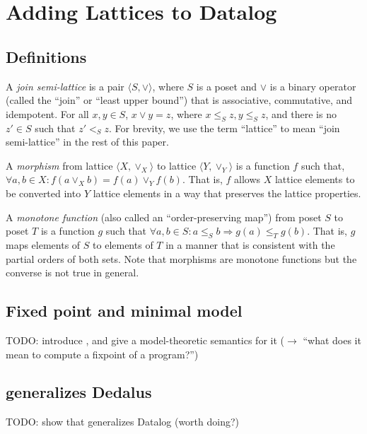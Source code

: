 \section{Adding Lattices to Datalog}
\label{sec:foundation}

\subsection{Definitions}
\label{sec:found-defn}
A \emph{join semi-lattice} is a pair $\langle S, \lor \rangle$, where $S$ is a
poset and $\lor$ is a binary operator (called the ``join'' or ``least upper
bound'') that is associative, commutative, and idempotent. For all $x, y \in S$,
$x \lor y = z$, where $x \leq_S z, y \leq_S z$, and there is no $z' \in S$ such
that $z' <_S z$. For brevity, we use the term ``lattice'' to mean ``join
semi-lattice'' in the rest of this paper.

A \emph{morphism} from lattice $\langle X, \lor_X\rangle$ to lattice $\langle Y,
\lor_Y\rangle$ is a function $f$ such that, $\forall a,b \in X: f(a \lor_X b) =
f(a) \lor_Y f(b)$. That is, $f$ allows $X$ lattice elements to be converted into
$Y$ lattice elements in a way that preserves the lattice properties.

A \emph{monotone function} (also called an ``order-preserving map'') from poset
$S$ to poset $T$ is a function $g$ such that $\forall a,b \in S: a \leq_S b
\Rightarrow g(a) \leq_T g(b)$. That is, $g$ maps elements of $S$ to elements of
$T$ in a manner that is consistent with the partial orders of both sets. Note
that morphisms are monotone functions but the converse is not true in general.

\subsection{Fixed point and minimal model}

TODO: introduce \baselang, and give a model-theoretic semantics for it ($\to$
``what does it mean to compute a fixpoint of a \baselang program?'')

\subsection{\baselang generalizes Dedalus}

TODO: show that \baselang generalizes Datalog (worth doing?)

